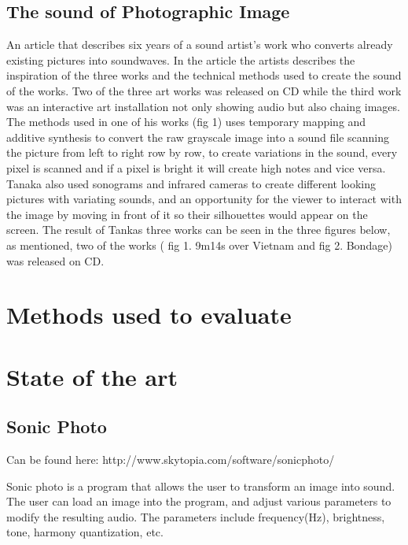 \subsection{The sound of Photographic Image}\label{sec:soundarticle}
An article that describes six years of a sound artist's work  who converts already existing pictures into soundwaves. In the article the artists describes the inspiration of the three works and the technical methods used to create the sound of the works. Two of the three art works was released on CD while the third work was an interactive art installation not only showing audio but also chaing images. The methods used in one of his works (fig 1) uses temporary mapping and additive synthesis to convert the raw grayscale image into a sound file scanning the picture from left to right row by row, to create variations in the sound, every pixel is scanned and if a pixel is bright it will create high notes and vice versa.  Tanaka also used sonograms and infrared cameras to create different looking pictures with variating sounds, and an opportunity for the viewer to interact with the image by moving in front of it so their silhouettes would appear on the screen. The result of Tankas three works can be seen in the three figures below, as mentioned, two of the works ( fig 1. 9m14s over Vietnam and fig 2. Bondage) was released on CD.


\section{Methods used to evaluate}\label{sub:methodsusedtoevaluate}






\section{State of the art}\label{sec:stateart}

\subsection{Sonic Photo}\label{sub:sonic}
Can be found here: http://www.skytopia.com/software/sonicphoto/

Sonic photo is a program that allows the user to transform an image into sound. The user can load an image into the program, and adjust various parameters to modify the resulting audio. The parameters include  frequency(Hz), brightness, tone, harmony quantization, etc.


